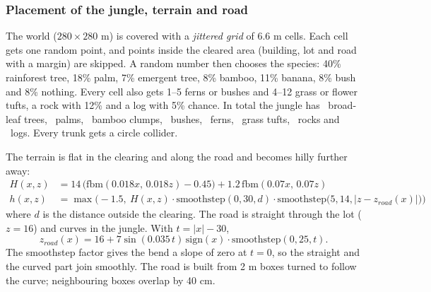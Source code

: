 \subsubsection{Placement of the jungle, terrain and road}\label{sec:terrain}
The world ($280\times280$ m) is covered with a \emph{jittered grid} of 6.6 m cells. Each cell gets one random
point, and points inside the cleared area (building, lot and road with a margin) are skipped. A random number
then chooses the species: 40\% rainforest tree, 18\% palm, 7\% emergent tree, 8\% bamboo, 11\% banana, 8\% bush and
8\% nothing. Every cell also gets 1--5 ferns or bushes and 4--12 grass or flower tufts, a rock with 12\% and a log
with 5\% chance. In total the jungle has \statJungleTrees\ broad-leaf trees, \statPalms\ palms, \statBamboo\
bamboo clumps, \statBushes\ bushes, \statFerns\ ferns, \statGrass\ grass tufts, \statRocks\ rocks and
\statLogs\ logs. Every trunk gets a circle collider.

The terrain is flat in the clearing and along the road and becomes hilly further away:
\begin{align*}
H(x,z) &= 14\,\big(\mathrm{fbm}(0.018x,\,0.018z)-0.45\big) + 1.2\,\mathrm{fbm}(0.07x,\,0.07z) \\
h(x,z) &= \max\!\Big(-1.5,\ H(x,z)\cdot \mathrm{smoothstep}(0,30,d)\cdot \mathrm{smoothstep}\big(5,14,|z-z_{road}(x)|\big)\Big)
\end{align*}
where $d$ is the distance outside the clearing. The road is straight through the lot ($z=16$) and curves in the
jungle. With $t=|x|-30$,
\[
z_{road}(x)=16 + 7\sin(0.035\,t)\,\mathrm{sign}(x)\cdot \mathrm{smoothstep}(0,25,t).
\]
The smoothstep factor gives the bend a slope of zero at $t=0$, so the straight and the curved part join smoothly.
The road is built from 2 m boxes turned to follow the curve; neighbouring boxes overlap by 40 cm.
